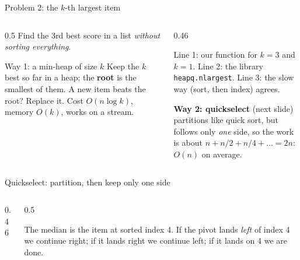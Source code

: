 \documentclass[aspectratio=169,10pt]{beamer}
\begin{document}
\begin{frame}{Problem 2: the $k$-th largest item}
\begin{columns}[T]
\begin{column}{0.5\textwidth}
{\small
Find the 3rd best score in a list \emph{without sorting everything}.}
\vspace{1mm}
\begin{block}{Way 1: a min-heap of size $k$}
{\small Keep the $k$ best so far in a heap; the \textbf{root} is the smallest of them. A new item beats the root? Replace it. Cost $O(n\log k)$, memory $O(k)$, works on a stream.}
\end{block}
\vspace{1mm}
\end{column}
\begin{column}{0.46\textwidth}
\vspace{2mm}
{\small
Line 1: our function for $k=3$ and $k=1$. Line 2: the library \texttt{heapq.nlargest}. Line 3: the slow way (sort, then index) agrees.

\vspace{2mm}
\textbf{Way 2: quickselect} (next slide) partitions like quick sort, but follows only \emph{one} side, so the work is about $n+n/2+n/4+\dots=2n$: $O(n)$ on average.}
\end{column}
\end{columns}
\end{frame}

\begin{frame}{Quickselect: partition, then keep only one side}
\begin{columns}[T]
\begin{column}{0.46\textwidth}
\end{column}
\begin{column}{0.5\textwidth}
\vspace{1mm}
\begin{sfig}[0.42]
\end{sfig}
\vspace{1mm}
{\small The median is the item at sorted index 4. If the pivot lands \emph{left} of index 4 we continue right; if it lands right we continue left; if it lands on 4 we are done.}
\end{column}
\end{columns}
\end{frame}
\end{document}
